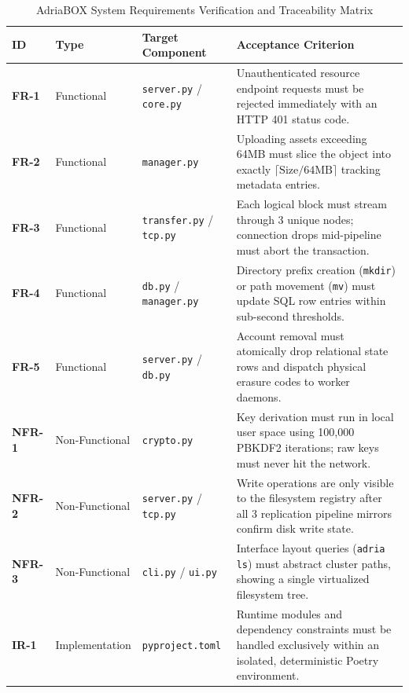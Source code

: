 \begin{table}[htbp]
\small
\centering
\caption{AdriaBOX System Requirements Verification and Traceability Matrix}
\label{tab:requirements_matrix}
\vspace{2mm}
\begin{tabularx}{\textwidth}{l l p{3.2cm} X}
\toprule
\textbf{ID} & \textbf{Type} & \textbf{Target Component} & \textbf{Acceptance Criterion} \\
\midrule
\textbf{FR-1} & Functional & \texttt{server.py} / \texttt{core.py} & Unauthenticated resource endpoint requests must be rejected immediately with an HTTP 401 status code. \\
\textbf{FR-2} & Functional & \texttt{manager.py} & Uploading assets exceeding 64MB must slice the object into exactly $\lceil \text{Size}/64\text{MB} \rceil$ tracking metadata entries. \\
\textbf{FR-3} & Functional & \texttt{transfer.py} / \texttt{tcp.py} & Each logical block must stream through 3 unique nodes; connection drops mid-pipeline must abort the transaction. \\
\textbf{FR-4} & Functional & \texttt{db.py} / \texttt{manager.py} & Directory prefix creation (\texttt{mkdir}) or path movement (\texttt{mv}) must update SQL row entries within sub-second thresholds. \\
\textbf{FR-5} & Functional & \texttt{server.py} / \texttt{db.py} & Account removal must atomically drop relational state rows and dispatch physical erasure codes to worker daemons. \\
\textbf{NFR-1} & Non-Functional & \texttt{crypto.py} & Key derivation must run in local user space using 100,000 PBKDF2 iterations; raw keys must never hit the network. \\
\textbf{NFR-2} & Non-Functional & \texttt{server.py} / \texttt{tcp.py} & Write operations are only visible to the filesystem registry after all 3 replication pipeline mirrors confirm disk write state. \\
\textbf{NFR-3} & Non-Functional & \texttt{cli.py} / \texttt{ui.py} & Interface layout queries (\texttt{adria ls}) must abstract cluster paths, showing a single virtualized filesystem tree. \\
\textbf{IR-1} & Implementation & \texttt{pyproject.toml} & Runtime modules and dependency constraints must be handled exclusively within an isolated, deterministic Poetry environment. \\
\bottomrule
\end{tabularx}
\end{table}

